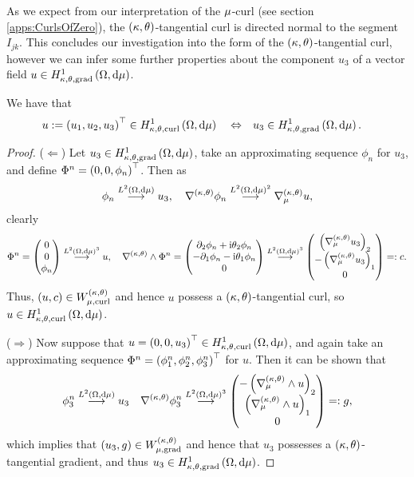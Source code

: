 As we expect from our interpretation of the $\mu$-curl (see section \ref{apps:CurlsOfZero}), the $\left( \kappa, \theta \right)$-tangential curl is directed normal to the segment $I_{jk}$.
This concludes our investigation into the form of the $\left( \kappa, \theta \right)$-tangential curl, however we can infer some further properties about the component $u_3$ of a vector field $u\in H^1_{\kappa,\theta,\mathrm{grad}}\left( \Omega, \mathrm{d}\mu \right)$.
\begin{prop} \label{prop:CurlImpliesThirdCompGradient}
	We have that
	\begin{align*}
		u:=\left( u_1,u_2,u_3 \right)^\top\in H^1_{\kappa,\theta,\mathrm{curl}}\left( \Omega, \mathrm{d}\mu \right)
		\quad\Leftrightarrow\quad &
		u_3\in H^1_{\kappa,\theta,\mathrm{grad}}\left( \Omega, \mathrm{d}\mu \right).
	\end{align*}
\end{prop}
\begin{proof}
	($\Leftarrow$) Let $u_3\in H^1_{\kappa,\theta,\mathrm{grad}}\left( \Omega, \mathrm{d}\mu \right)$, take an approximating sequence $\phi_n$ for $u_3$, and define $\Phi^n=\left( 0,0,\phi_n \right)^\top$.
	Then as
	\begin{align*}
		\phi_n \overset{L^{2}\left( \Omega,\mathrm{d}\mu \right)}{\longrightarrow} u_3, \quad \nabla^{\left( \kappa, \theta \right)}\phi_n \overset{L^{2}\left( \Omega,\mathrm{d}\mu \right)^2}{\longrightarrow} \nabla^{\left( \kappa, \theta \right)}_{\mu}u,
	\end{align*}
	clearly
	\begin{align*}
		\Phi^n = \begin{pmatrix} 0 \\ 0 \\ \phi_n \end{pmatrix} \overset{L^{2}\left( \Omega,\mathrm{d}\mu \right)^3}{\longrightarrow} u, \quad
		\nabla_{}^{\left( \kappa, \theta \right)}\wedge\Phi^n = \begin{pmatrix} \partial_2\phi_n + \mathrm{i}\theta_2\phi_n \\ -\partial_1\phi_n - \mathrm{i}\theta_1\phi_n \\ 0 \end{pmatrix} 
		\overset{L^{2}\left( \Omega,\mathrm{d}\mu \right)^3}{\longrightarrow} \begin{pmatrix} \left( \nabla^{\left( \kappa, \theta \right)}_{\mu}u_3 \right)_2 \\ -\left( \nabla^{\left( \kappa, \theta \right)}_{\mu}u_3 \right)_1 \\ 0	\end{pmatrix} =: c.
	\end{align*}
	Thus, $\left( u, c \right)\in W^{\left( \kappa, \theta \right)}_{\mu,\mathrm{curl}}$ and hence $u$ possess a $\left( \kappa, \theta \right)$-tangential curl, so $u\in H^1_{\kappa,\theta,\mathrm{curl}}\left( \Omega, \mathrm{d}\mu \right)$.
	
	($\Rightarrow$) Now suppose that $u=\left( 0,0,u_3 \right)^\top\in H^1_{\kappa,\theta,\mathrm{curl}}\left( \Omega, \mathrm{d}\mu \right)$, and again take an approximating sequence $\Phi^n = \left( \phi^n_1, \phi^n_2, \phi^n_3 \right)^\top$ for $u$.
	Then it can be shown that
	\begin{align*}
		\phi^n_3 \overset{L^{2}\left( \Omega,\mathrm{d}\mu \right)}{\longrightarrow} u_3
		\quad \nabla^{\left( \kappa, \theta \right)}\phi^n_3 \overset{L^{2}\left( \Omega,\mathrm{d}\mu \right)^3}{\longrightarrow} \begin{pmatrix} -\left(  \nabla_{\mu}^{\left( \kappa, \theta \right)}\wedge u \right)_2 \\ \left(  \nabla_{\mu}^{\left( \kappa, \theta \right)}\wedge u \right)_1 \\ 0 \end{pmatrix} =: g,
	\end{align*}
	which implies that $\left( u_3,g \right)\in W^{\left( \kappa, \theta \right)}_{\mu,\mathrm{grad}}$ and hence that $u_3$ possesses a $\left( \kappa, \theta \right)$-tangential gradient, and thus $u_3\in H^1_{\kappa,\theta,\mathrm{grad}}\left( \Omega, \mathrm{d}\mu \right)$.
\end{proof}
